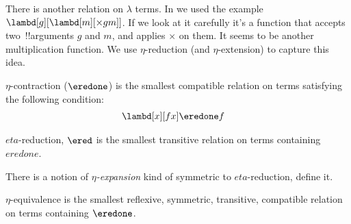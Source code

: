 \documentclass[../../../include/open-logic-section]{subfiles}
\begin{document}

There is another relation on $\lambda$ terms. In
 we used the example $\lambd[g][\lambd[m][\times g
m]]$. If we look at it carefully it's a function that accepts two~!!{argument}s
$g$ and $m$, and applies $\times$ on them. It seems to be another
multiplication function. We use $\eta$-reduction (and $\eta$-extension) to
capture this idea.

\begin{defn}
  $\eta$-contraction ($\eredone$) is the smallest compatible relation
  on terms satisfying the following condition:
  \begin{align*}
    &\lambd[x][f x] \eredone f
  \end{align*}
\end{defn}

\begin{defn}
  $eta$-reduction, $\ered$ is the smallest transitive relation on terms
  containing $eredone$.
\end{defn}

\begin{prob}
  There is a notion of \emph{$\eta$-expansion} kind of symmetric to
  $eta$-reduction, define it.
\end{prob}

\begin{defn}
  $\eta$-equivalence is the smallest reflexive, symmetric, transitive, compatible relation on terms containing $\eredone$.
\end{defn}
\end{document}
